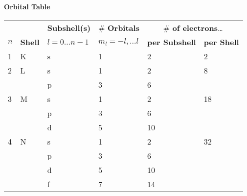 \paragraph{Orbital Table}
\renewcommand{\arraystretch}{1.1}
\setlength{\oldtabcolsep}{\tabcolsep}\setlength\tabcolsep{3pt}
{\small     %
    \begin{tabularx}{\linewidth}{@{}llllll@{}}
            &                & \textbf{Subshell(s)} & \# \textbf{Orbitals} & \multicolumn{2}{c}{\# \textbf{of electrons}\dots}                      \\
        $n$ & \textbf{Shell} & $l=0\dots n-1$       & $m_{l}=-l,\dots l$   & \textbf{per Subshell}                             & \textbf{per Shell} \\
        1   & K              & s                    & 1                    & 2                                                 & 2                  \\
        \cmidrule{1-6}
        2   & L              & s                    & 1                    & 2                                                 & 8                  \\
            &                & p                    & 3                    & 6                                                 &                    \\
        \cmidrule{1-6}
        3   & M              & s                    & 1                    & 2                                                 & 18                 \\
            &                & p                    & 3                    & 6                                                 &                    \\
            &                & d                    & 5                    & 10                                                &                    \\
        \cmidrule{1-6}
        4   & N              & s                    & 1                    & 2                                                 & 32                 \\
            &                & p                    & 3                    & 6                                                 &                    \\
            &                & d                    & 5                    & 10                                                &                    \\
            &                & f                    & 7                    & 14                                                &
    \end{tabularx}
}           %
\renewcommand{\arraystretch}{1}
\setlength{\tabcolsep}{\oldtabcolsep}


